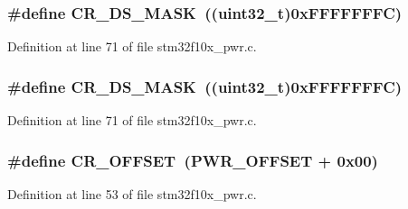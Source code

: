 \subsubsection[{\texorpdfstring{C\+R\+\_\+\+D\+S\+\_\+\+M\+A\+SK}{CR_DS_MASK}}]{\setlength{\rightskip}{0pt plus 5cm}\#define C\+R\+\_\+\+D\+S\+\_\+\+M\+A\+SK~(({\bf uint32\+\_\+t})0x\+F\+F\+F\+F\+F\+F\+F\+C)}\hypertarget{group___p_w_r___private___defines_ga8ee6bf9218f3c476629dd9ee70deef21}{}\label{group___p_w_r___private___defines_ga8ee6bf9218f3c476629dd9ee70deef21}


Definition at line 71 of file stm32f10x\+\_\+pwr.\+c.

\subsubsection[{\texorpdfstring{C\+R\+\_\+\+D\+S\+\_\+\+M\+A\+SK}{CR_DS_MASK}}]{\setlength{\rightskip}{0pt plus 5cm}\#define C\+R\+\_\+\+D\+S\+\_\+\+M\+A\+SK~(({\bf uint32\+\_\+t})0x\+F\+F\+F\+F\+F\+F\+F\+C)}\hypertarget{group___p_w_r___private___defines_ga8ee6bf9218f3c476629dd9ee70deef21}{}\label{group___p_w_r___private___defines_ga8ee6bf9218f3c476629dd9ee70deef21}


Definition at line 71 of file stm32f10x\+\_\+pwr.\+c.

\subsubsection[{\texorpdfstring{C\+R\+\_\+\+O\+F\+F\+S\+ET}{CR_OFFSET}}]{\setlength{\rightskip}{0pt plus 5cm}\#define C\+R\+\_\+\+O\+F\+F\+S\+ET~({\bf P\+W\+R\+\_\+\+O\+F\+F\+S\+ET} + 0x00)}\hypertarget{group___p_w_r___private___defines_gafa1d3d0ea72132df651c76fc1bdffffc}{}\label{group___p_w_r___private___defines_gafa1d3d0ea72132df651c76fc1bdffffc}


Definition at line 53 of file stm32f10x\+\_\+pwr.\+c.

